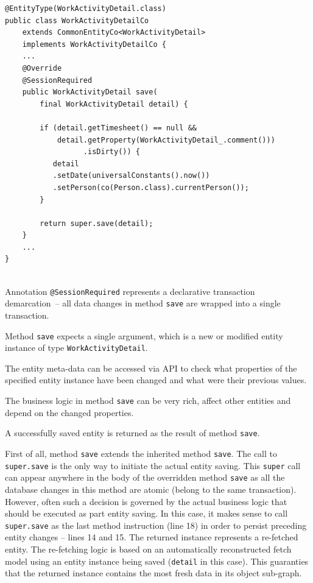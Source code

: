 \documentclass[a4paper,12pt,oneside,openright,final]{memoir} %
\begin{document}
	\begin{tcolorbox}[sidebyside, righthand width=0.25\textwidth, title=Example: simple \texttt{save} operation]
    \begin{lstlisting}[numbersep=2pt]
@EntityType(WorkActivityDetail.class)
public class WorkActivityDetailCo 
    extends CommonEntityCo<WorkActivityDetail> 
    implements WorkActivityDetailCo {
    ...
    @Override
    @SessionRequired
    public WorkActivityDetail save(
        final WorkActivityDetail detail) {
    
        if (detail.getTimesheet() == null && 
            detail.getProperty(WorkActivityDetail_.comment()))
			      .isDirty()) {
           detail
           .setDate(universalConstants().now())
           .setPerson(co(Person.class).currentPerson());
        }
    
        return super.save(detail);
    }
    ...
}    
	
	\end{lstlisting}
	\tcblower
		\tiny
		 Annotation \texttt{@SessionRequired} represents a declarative transaction demarcation~-- all data changes in method \texttt{save} are wrapped into a single transaction.

		 \medskip
		 Method \texttt{save} expects a single argument, which is a new or modified entity instance of type \texttt{WorkActivityDetail}.

		 \medskip		 
		 The entity meta-data can be accessed via API to check what properties of the specified entity instance have been changed and what were their previous values.

		 \medskip		 
		 The business logic in method \texttt{save} can be very rich, affect other entities and depend on the changed properties.
		 
		 \medskip		 
		 A successfully saved entity is returned as the result of method \texttt{save}.
		 
 	\end{tcolorbox}	

	First of all, method \texttt{save} extends the inherited method \texttt{save}.
	The call to \texttt{super.save} is the only way to initiate the actual entity saving.
	This \texttt{super} call can appear anywhere in the body of the overridden method \texttt{save} as all the database changes in this method are atomic (belong to the same transaction).
	However, often such a decision is governed by the actual business logic that should be executed as part entity saving.
	In this case, it makes sense to call \texttt{super.save} as the last method instruction (line 18) in order to persist preceding entity changes -- lines 14 and 15.
	The returned instance represents a re-fetched entity.
	The re-fetching logic is based on an automatically reconstructed fetch model using an entity instance being saved (\texttt{detail} in this case).
	This guaranties that the returned instance contains the most fresh data in its object sub-graph.
	
\end{document}
